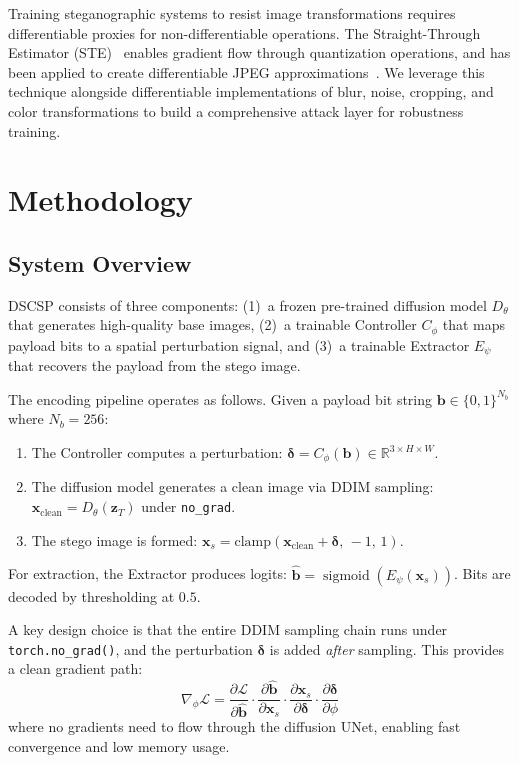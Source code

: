 \documentclass[10pt, twocolumn]{article}
\newcommand{\R}{\mathbb{R}}
\newcommand{\Lcal}{\mathcal{L}}
\DeclareMathOperator{\sigmoid}{sigmoid}
\begin{document}
Training steganographic systems to resist image transformations requires differentiable proxies for non-differentiable operations.
The Straight-Through Estimator (STE)~\cite{bengio2013estimating} enables gradient flow through quantization operations, and has been applied to create differentiable JPEG approximations~\cite{shin2017jpeg}.
We leverage this technique alongside differentiable implementations of blur, noise, cropping, and color transformations to build a comprehensive attack layer for robustness training.


\section{Methodology}
\label{sec:method}

\subsection{System Overview}
\label{sec:overview}

DSCSP consists of three components: (1)~a frozen pre-trained diffusion model $D_\theta$ that generates high-quality base images, (2)~a trainable Controller $C_\phi$ that maps payload bits to a spatial perturbation signal, and (3)~a trainable Extractor $E_\psi$ that recovers the payload from the stego image.

The encoding pipeline operates as follows.
Given a payload bit string $\mathbf{b} \in \{0,1\}^{N_b}$ where $N_b = 256$:
\begin{enumerate}[itemsep=1pt, topsep=2pt]
    \item The Controller computes a perturbation: $\bm{\delta} = C_\phi(\mathbf{b}) \in \R^{3 \times H \times W}$.
    \item The diffusion model generates a clean image via DDIM sampling: $\mathbf{x}_\text{clean} = D_\theta(\mathbf{z}_T)$ under \texttt{no\_grad}.
    \item The stego image is formed: $\mathbf{x}_s = \text{clamp}(\mathbf{x}_\text{clean} + \bm{\delta},\, -1,\, 1)$.
\end{enumerate}
For extraction, the Extractor produces logits: $\hat{\mathbf{b}} = \sigmoid(E_\psi(\mathbf{x}_s))$.
Bits are decoded by thresholding at $0.5$.

A key design choice is that the entire DDIM sampling chain runs under \texttt{torch.no\_grad()}, and the perturbation $\bm{\delta}$ is added \emph{after} sampling.
This provides a clean gradient path:
\begin{equation}
    \nabla_\phi \Lcal = \frac{\partial \Lcal}{\partial \hat{\mathbf{b}}} \cdot \frac{\partial \hat{\mathbf{b}}}{\partial \mathbf{x}_s} \cdot \frac{\partial \mathbf{x}_s}{\partial \bm{\delta}} \cdot \frac{\partial \bm{\delta}}{\partial \phi}
    \label{eq:grad_path}
\end{equation}
where no gradients need to flow through the diffusion UNet, enabling fast convergence and low memory usage.
\end{document}
